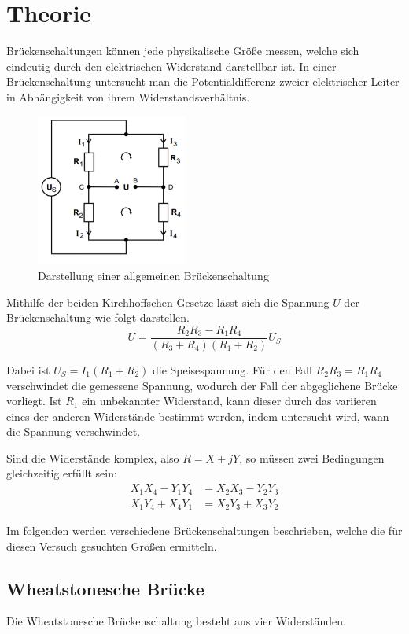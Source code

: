\section{Theorie}
\label{sec:Theorie}

Brückenschaltungen können jede physikalische Größe messen, welche sich eindeutig durch den
elektrischen Widerstand darstellbar ist. In einer Brückenschaltung untersucht man die Potentialdifferenz zweier elektrischer Leiter
in Abhängigkeit von ihrem Widerstandsverhältnis.


\begin{figure}[H]
  \centering
  \includegraphics[height=5cm]{bruecke.PNG}
  \caption{Darstellung einer allgemeinen Brückenschaltung}
  \label{fig:Brückenschaltung}
\end{figure}

Mithilfe der beiden Kirchhoffschen Gesetze lässt sich die Spannung $U$ der Brückenschaltung wie folgt darstellen.
\begin{equation}
  U = \frac{R_2 R_3 - R_1 R_4}{(R_3+R_4)(R_1+R_2)}U_S
\end{equation}

Dabei ist $U_S = I_1(R_1+R_2)$ die Speisespannung. Für den Fall $R_2R_3=R_1R_4$ verschwindet die gemessene Spannung, wodurch der Fall
der abgeglichene Brücke vorliegt. Ist $R_1$ ein unbekannter Widerstand, kann dieser durch das variieren eines der anderen Widerstände bestimmt werden,
indem untersucht wird, wann die Spannung verschwindet.

Sind die Widerstände komplex, also $R= X + jY$, so müssen zwei Bedingungen gleichzeitig erfüllt sein:
\begin{align}
  X_1X_4 -Y_1Y_4 &= X_2X_3 - Y_2Y_3 \\
  X_1Y_4 +X_4Y_1 &= X_2Y_3 + X_3Y_2
\end{align}


Im folgenden werden verschiedene
Brückenschaltungen beschrieben, welche die für diesen Versuch gesuchten Größen ermitteln.

\subsection{Wheatstonesche Brücke}
Die Wheatstonesche Brückenschaltung besteht aus vier Widerständen.

